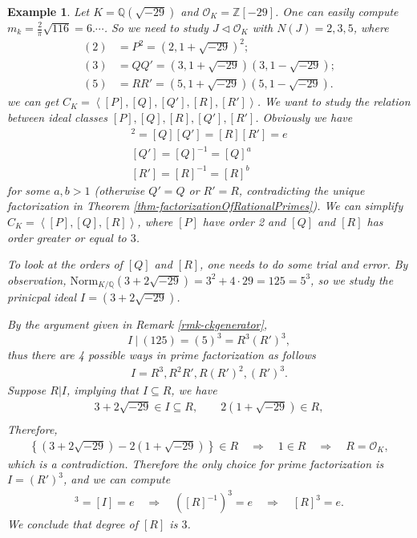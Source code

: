 \documentclass[11pt]{book}
\newtheorem{example}[theorem]{Example}
\begin{document}
\begin{example}
    Let \(K = \mathbb{Q}(\sqrt{-29})\) and \(\mathcal{O}_K = \displaystyle \mathbb{Z}[-29]\). One can easily compute \(m_k = \frac{2}{\pi} \sqrt{116} = 6. \cdots\). So we need to study \(J \triangleleft \mathcal{O}_K\) with \(N(J) = 2,3,5\), where
    \begin{align*}
        (2) &=  P^2 = (2,1+\sqrt{-29})^2;\\
        (3) &= Q Q' = (3, 1+\sqrt{-29})(3,1-\sqrt{-29});\\
        (5) &= R R' = (5, 1+\sqrt{-29})(5, 1-\sqrt{-29}).
    \end{align*}
    we can get \(C_K = \left< [P], [Q], [Q'], [R], [R']  \right>\). We want to study the relation between ideal classes \([P],[Q],[R], [Q'],[R']\). Obviously we have 
    \begin{align*}
        [P]^2 = [Q][Q'] = [R][R'] = e\\
        [Q'] = [Q]^{-1} = [Q]^a\\
        [R'] = [R]^{-1} = [R]^b
    \end{align*}
    for some \(a,b > 1\) (otherwise $Q' = Q$ or $R' = R$, contradicting the unique factorization in Theorem \ref{thm-factorizationOfRationalPrimes}). We can simplify \(C_K = \left< [P], [Q], [R]\right>\), where \([P]\) have order 2 and \([Q]\) and $[R]$ has order greater or equal to \(3\).
    
    To look at the orders of $[Q]$ and $[R]$, one needs to do some trial and error. By observation, $\mathrm{Norm}_{K/\mathbb{Q}}(3+2\sqrt{-29}) = 3^2 + 4\cdot 29 = 125 = 5^3$, so we study the prinicpal ideal
    \(I = (3+2 \sqrt{-29})\). 

    By the argument given in Remark \ref{rmk-ckgenerator}, 
    $$I\ |\ (125) = (5)^3 = R^3(R')^3,$$
    thus there are 4 possible ways in prime factorization as follows
    \begin{align*}
        I = R^3, R^2 R' , R (R')^2 , (R')^3.
    \end{align*}
    Suppose \(R|I\), implying that \(I \subseteq R\), we have
    \begin{align*}
        3+2\sqrt{-29} \in I \subseteq R,\quad \quad 2 (1+\sqrt{-29}) \in R,\\ 
    \end{align*}
    Therefore, 
    \begin{align*}
        \left\{(3+2\sqrt{-29}) - 2(1+\sqrt{-29}) \right\} \in R\quad 
        \Rightarrow \quad 1\in R\quad
        \Rightarrow \quad R= \mathcal{O}_K,
    \end{align*}
    which is a contradiction. Therefore the only choice for prime factorization is \(I = (R')^3\), and we can compute
\begin{align*}
    [R']^3 = [I] =e \quad 
    \Rightarrow\quad  \left([R]^{-1}\right)^3 = e\quad
    \Rightarrow \quad [R]^3 = e.
\end{align*}
We conclude that degree of \([R]\) is \(3\). 


\end{example}
\end{document}
